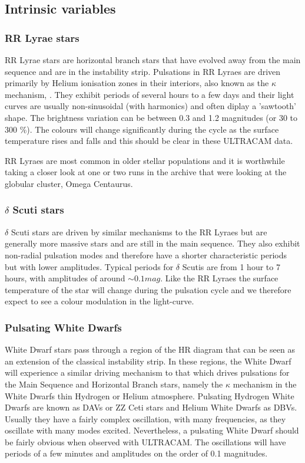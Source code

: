\subsection{Intrinsic variables}

\subsubsection{RR Lyrae stars}
RR Lyrae stars are horizontal branch stars that have evolved away from the main sequence and are in the instability strip. Pulsations in RR Lyraes are driven primarily by Helium ionisation zones in their interiors, also known as the $\kappa$ mechanism, \cite{asteroseismology}. They exhibit periods of several hours to a few days and their light curves are usually non-sinusoidal (with harmonics) and often diplay a 'sawtooth' shape. The brightness variation can be between 0.3 and 1.2 magnitudes (or 30 to 300 \%). The colours will change significantly during the cycle as the surface temperature rises and falls and this should be clear in these ULTRACAM data. 

RR Lyraes are most common in older stellar populations and it is worthwhile taking a closer look at one or two runs in the archive that were looking at the globular cluster, Omega Centaurus. 

\subsubsection{$\delta$ Scuti stars}
$\delta$ Scuti stars are driven by similar mechanisms to the RR Lyraes but are generally more massive stars and are still in the main sequence. They also exhibit non-radial pulsation modes and therefore have a shorter characteristic periods but with lower amplitudes. Typical periods for $\delta$ Scutis are from 1 hour to 7 hours, with amplitudes of around $\sim 0.1 mag$. Like the RR Lyraes the surface temperature of the star will change during the pulsation cycle and we therefore expect to see a colour modulation in the light-curve. 

\subsubsection{Pulsating White Dwarfs}
White Dwarf stars pass through a region of the HR diagram that can be seen as an extension of the classical instability strip. In these regions, the White Dwarf will experience a similar driving mechanism to that which drives pulsations for the Main Sequence and Horizontal Branch stars, namely the $\kappa$ mechanism in the White Dwarfs thin Hydrogen or Helium atmosphere. Pulsating Hydrogen White Dwarfs are known as {DAVs} or {ZZ Ceti} stars and Helium White Dwarfs as {DBV}s. Usually they have a fairly complex oscillation, with many frequencies, as they oscillate with many modes excited. Nevertheless, a pulsating White Dwarf should be fairly obvious when observed with ULTRACAM. The oscillations will have periods of a few minutes and amplitudes on the order of 0.1 magnitudes. 

